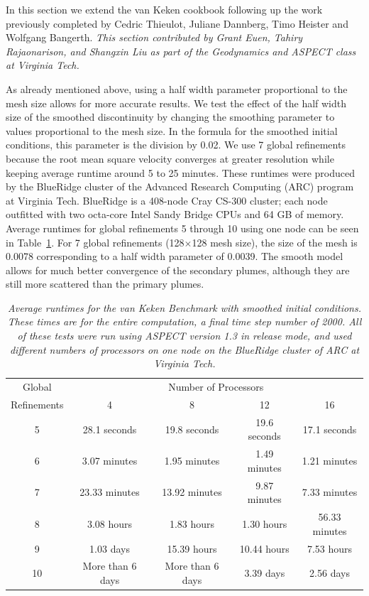 \documentclass{article}
\begin{document}
In this section we extend the van Keken cookbook following up the work previously completed by Cedric Thieulot, Juliane Dannberg,
Timo Heister and Wolfgang Bangerth.  \textit{This section contributed by Grant Euen, Tahiry Rajaonarison, and Shangxin Liu as part of the Geodynamics and ASPECT class at Virginia Tech.}  

As already mentioned above, using a half width parameter proportional to the mesh size allows for more accurate results.  We test the effect of the half width size of the smoothed discontinuity by changing the smoothing parameter to values proportional to the mesh size.  In the formula for the smoothed initial conditions, this parameter is the division by 0.02.  We use 7 global refinements because the root mean square velocity converges at greater resolution while keeping average runtime around 5 to 25 minutes.  These runtimes were produced by the BlueRidge cluster of the Advanced Research Computing (ARC) program at Virginia Tech.  BlueRidge is a 408-node Cray CS-300 cluster; each node outfitted with two octa-core Intel Sandy Bridge CPUs and 64 GB of memory.  Average runtimes for global refinements 5 through 10 using one node can be seen in Table~\ref{tab:runtime-table}.  For 7 global refinements (128$\times$128 mesh size), the size of the mesh is 0.0078 corresponding to a half width parameter of 0.0039.  The smooth model allows for much better convergence of the secondary plumes, although they are still more scattered than the primary plumes.

\begin{table}[htb]
        \center
        \begin{tabular}{|c|cccc|}
                \hline
                Global & \multicolumn{4}{|c|}{Number of Processors} \\
                Refinements & 4 & 8 & 12 & 16
                \\ \hline
                5 & 28.1 seconds & 19.8 seconds & 19.6 seconds & 17.1 seconds \\
                6 & 3.07 minutes & 1.95 minutes & 1.49 minutes & 1.21 minutes \\
                7 & 23.33 minutes & 13.92 minutes & 9.87 minutes & 7.33 minutes \\
                8 & 3.08 hours & 1.83 hours & 1.30 hours & 56.33 minutes \\
                9 & 1.03 days & 15.39 hours & 10.44 hours & 7.53 hours \\
                10 & More than 6 days & More than 6 days & 3.39 days & 2.56 days \\ \hline
        \end{tabular}
        \caption{\it Average runtimes for the van Keken Benchmark with smoothed initial conditions.  These times are for the entire computation, a final time step number of 2000.  All of these tests were run using ASPECT version 1.3 in release mode, and used different numbers of processors on one node on the BlueRidge cluster of ARC at Virginia Tech.}
        \label{tab:runtime-table}
\end{table}
\end{document}
